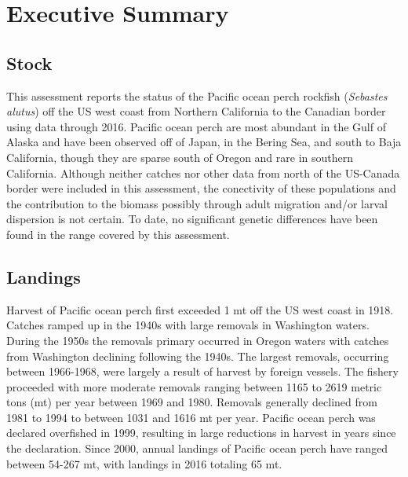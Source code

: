 \documentclass[12pt,]{article}
\begin{document}
{
\setcounter{tocdepth}{4}
\tableofcontents
}
\setlength{\parskip}{5mm plus1mm minus1mm} \pagebreak

\setcounter{page}{1} \renewcommand{\thefigure}{\alph{figure}}
\renewcommand{\thetable}{\alph{table}}

\section*{Executive Summary}\label{executive-summary}

\subsection*{Stock}\label{stock}

This assessment reports the status of the Pacific ocean perch rockfish
(\emph{Sebastes alutus}) off the US west coast from Northern California
to the Canadian border using data through 2016. Pacific ocean perch are
most abundant in the Gulf of Alaska and have been observed off of Japan,
in the Bering Sea, and south to Baja California, though they are sparse
south of Oregon and rare in southern California. Although neither
catches nor other data from north of the US-Canada border were included
in this assessment, the conectivity of these populations and the
contribution to the biomass possibly through adult migration and/or
larval dispersion is not certain. To date, no significant genetic
differences have been found in the range covered by this assessment.

\subsection*{Landings}\label{landings}

Harvest of Pacific ocean perch first exceeded 1 mt off the US west coast
in 1918. Catches ramped up in the 1940s with large removals in
Washington waters. During the 1950s the removals primary occurred in
Oregon waters with catches from Washington declining following the
1940s. The largest removals, occurring between 1966-1968, were largely a
result of harvest by foreign vessels. The fishery proceeded with more
moderate removals ranging between 1165 to 2619 metric tons (mt) per year
between 1969 and 1980. Removals generally declined from 1981 to 1994 to
between 1031 and 1616 mt per year. Pacific ocean perch was declared
overfished in 1999, resulting in large reductions in harvest in years
since the declaration. Since 2000, annual landings of Pacific ocean
perch have ranged between 54-267 mt, with landings in 2016 totaling 65
mt.
\end{document}
